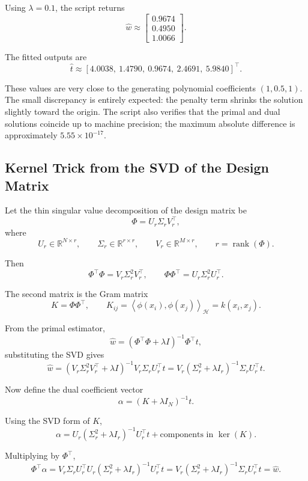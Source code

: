 \documentclass[11pt]{article}
\newcommand{\R}{\mathbb{R}}
\newcommand{\Hspace}{\mathcal{H}}
\newcommand{\inner}[2]{\left\langle #1, #2 \right\rangle}
\newcommand{\transpose}{^{\top}}
\begin{document}
Using $\lambda = 0.1$, the script returns
\[
\widehat{w}
\approx
\begin{bmatrix}
0.9674 \\
0.4950 \\
1.0066
\end{bmatrix}.
\]

The fitted outputs are
\[
\widehat{t}
\approx
[4.0038,\ 1.4790,\ 0.9674,\ 2.4691,\ 5.9840]\transpose.
\]

These values are very close to the generating polynomial coefficients $(1,0.5,1)$. The small discrepancy is entirely expected: the penalty term shrinks the solution slightly toward the origin. The script also verifies that the primal and dual solutions coincide up to machine precision; the maximum absolute difference is approximately $5.55 \times 10^{-17}$.

\subsection{Kernel Trick from the SVD of the Design Matrix}

Let the thin singular value decomposition of the design matrix be
\[
\Phi = U_r \Sigma_r V_r\transpose,
\]
where
\[
U_r \in \R^{N \times r},
\qquad
\Sigma_r \in \R^{r \times r},
\qquad
V_r \in \R^{M \times r},
\qquad
r = \operatorname{rank}(\Phi).
\]

Then
\[
\Phi\transpose \Phi = V_r \Sigma_r^2 V_r\transpose,
\qquad
\Phi \Phi\transpose = U_r \Sigma_r^2 U_r\transpose.
\]

The second matrix is the Gram matrix
\[
K = \Phi \Phi\transpose,
\qquad
K_{ij} = \inner{\phi(x_i)}{\phi(x_j)}_{\Hspace} = k(x_i,x_j).
\]

From the primal estimator,
\[
\widehat{w}
=
(\Phi\transpose \Phi + \lambda I)^{-1}\Phi\transpose t,
\]
substituting the SVD gives
\[
\widehat{w}
=
\left(V_r \Sigma_r^2 V_r\transpose + \lambda I\right)^{-1}
V_r \Sigma_r U_r\transpose t
=
V_r (\Sigma_r^2 + \lambda I_r)^{-1}\Sigma_r U_r\transpose t.
\]

Now define the dual coefficient vector
\[
\alpha = (K + \lambda I_N)^{-1}t.
\]

Using the SVD form of $K$,
\[
\alpha
=
U_r (\Sigma_r^2 + \lambda I_r)^{-1} U_r\transpose t
+
\text{components in } \ker(K).
\]

Multiplying by $\Phi\transpose$,
\[
\Phi\transpose \alpha
=
V_r \Sigma_r U_r\transpose
U_r (\Sigma_r^2 + \lambda I_r)^{-1} U_r\transpose t
=
V_r (\Sigma_r^2 + \lambda I_r)^{-1}\Sigma_r U_r\transpose t
=
\widehat{w}.
\]
\end{document}
